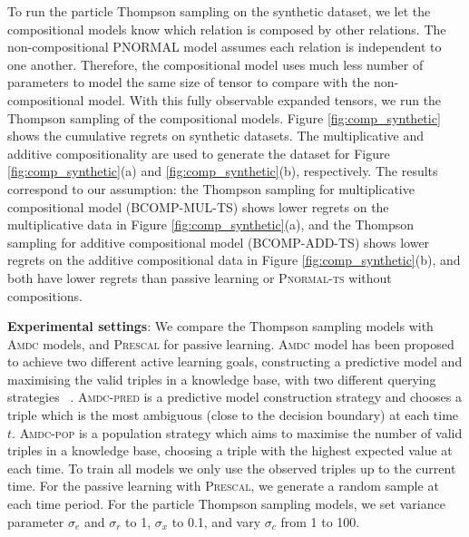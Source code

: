 {To run the particle Thompson sampling on the synthetic dataset, we let the
compositional models know which relation is composed by other relations.
The non-compositional PNORMAL model assumes each relation is independent to one another.
Therefore, the compositional model uses much less number of parameters to model
the same size of tensor to compare with the non-compositional model.
With this fully observable expanded tensors, we run the Thompson sampling of
the compositional models.
Figure \ref{fig:comp_synthetic} shows the cumulative regrets on synthetic
datasets. The multiplicative and additive compositionality are used to
generate the dataset for Figure \ref{fig:comp_synthetic}(a) and
\ref{fig:comp_synthetic}(b), respectively. The results correspond to our
assumption: the Thompson sampling for multiplicative compositional model (BCOMP-MUL-TS) shows lower
regrets on the multiplicative data in Figure \ref{fig:comp_synthetic}(a), and
the Thompson sampling for additive compositional model (BCOMP-ADD-TS) shows lower regrets on the
additive compositional data in Figure \ref{fig:comp_synthetic}(b),
and both have lower regrets than passive learning or \textsc{Pnormal-ts} without compositions.
}

%

\textbf{Experimental settings}:
We compare the Thompson sampling models with \textsc{Amdc} models, and \textsc{Prescal} for passive learning.
\textsc{Amdc} model has been proposed to achieve two different active learning goals, constructing a predictive
model and maximising the valid triples in a knowledge base, with two different querying strategies
~\cite{kajino2015active}.
\textsc{Amdc-pred} is a predictive model construction strategy and chooses a triple which is the most ambiguous (close to the decision boundary) at each time $t$.
\textsc{Amdc-pop} is a population strategy which aims to maximise the number of valid triples in a knowledge base, choosing a triple with the highest expected value at each time.
To train all models we only use the observed triples up to the current time.
For the passive learning with \textsc{Prescal}, we generate a random sample at each time period.
For the particle Thompson sampling models, we set variance parameter $\sigma_e$ and $\sigma_r$ to 1, $\sigma_x$ to 0.1, and vary $\sigma_c$ from 1 to 100.

